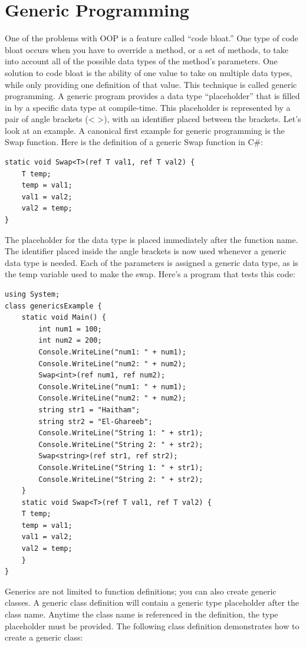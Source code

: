 \documentclass[12pt,a4paper,final,twoside,titlepage]{book}
\begin{document}
\section{Generic Programming}
One of the problems with OOP is a feature called “code bloat.” One type of code bloat occurs when you have to override a method, or a set of methods, to take into account all of the possible data types of the method’s parameters. One solution to code bloat is the ability of one value to take on multiple data types, while only providing one definition of that value. This technique is called generic programming.
A generic program provides a data type “placeholder” that is filled in by a specific data type at compile-time. This placeholder is represented by a pair of angle brackets (< >), with an identifier placed between the brackets. Let’s look at an example.
A canonical first example for generic programming is the Swap function. Here is the definition of a generic Swap function in C\#:
\begin{lstlisting}
static void Swap<T>(ref T val1, ref T val2) { 
	T temp;
	temp = val1; 
	val1 = val2; 
	val2 = temp;
}
\end{lstlisting}
The placeholder for the data type is placed immediately after the function name. The identifier placed inside the angle brackets is now used whenever a generic data type is needed. Each of the parameters is assigned a generic data type, as is the temp variable used to make the swap. Here’s a program that tests this code:
\begin{lstlisting}
using System;
class genericsExample { 
	static void Main() {
		int num1 = 100; 
		int num2 = 200; 
		Console.WriteLine("num1: " + num1); 
		Console.WriteLine("num2: " + num2); 
		Swap<int>(ref num1, ref num2); 
		Console.WriteLine("num1: " + num1); 
		Console.WriteLine("num2: " + num2); 
		string str1 = "Haitham"; 
		string str2 = "El-Ghareeb"; 
		Console.WriteLine("String 1: " + str1); 
		Console.WriteLine("String 2: " + str2); 
		Swap<string>(ref str1, ref str2); 
		Console.WriteLine("String 1: " + str1); 
		Console.WriteLine("String 2: " + str2);
	}
	static void Swap<T>(ref T val1, ref T val2) { 
	T temp;
	temp = val1; 
	val1 = val2; 
	val2 = temp;
	}
}
\end{lstlisting}
Generics are not limited to function definitions; you can also create generic classes. A generic class definition will contain a generic type placeholder after the class name. Anytime the class name is referenced in the definition, the type placeholder must be provided. The following class definition demonstrates how to create a generic class:
\end{document}

